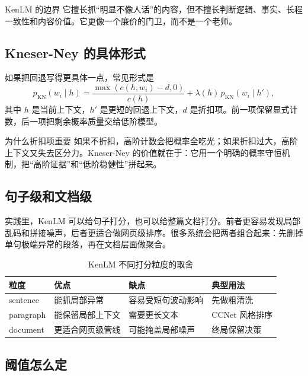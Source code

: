 \documentclass[a4paper]{article}
\begin{document}
\begin{warningbox}{KenLM 的边界}
它擅长抓“明显不像人话”的内容，但不擅长判断逻辑、事实、长程一致性和内容价值。它更像一个廉价的门卫，而不是一个老师。
\end{warningbox}

\subsection{Kneser-Ney 的具体形式}

如果把回退写得更具体一点，常见形式是
\[
p_{\mathrm{KN}}(w_i\mid h)=\frac{\max(c(h,w_i)-d,0)}{c(h)}+\lambda(h)\,p_{\mathrm{KN}}(w_i\mid h'),
\]
其中 $h$ 是当前上下文，$h'$ 是更短的回退上下文，$d$ 是折扣项。前一项保留显式计数，后一项把剩余概率质量交给低阶模型。

\begin{importantbox}{为什么折扣项重要}
如果不折扣，高阶计数会把概率全吃光；如果折扣过大，高阶上下文又失去区分力。Kneser-Ney 的价值就在于：它用一个明确的概率守恒机制，把“高阶证据”和“低阶稳健性”拼起来。
\end{importantbox}

\subsection{句子级和文档级}

实践里，KenLM 可以给句子打分，也可以给整篇文档打分。前者更容易发现局部乱码和拼接噪声，后者更适合做网页级排序。很多系统会把两者组合起来：先删掉单句极端异常的段落，再在文档层面做聚合。

\begin{table}[H]
\centering
\small
\renewcommand{\arraystretch}{1.15}
\begin{tabular}{p{2.4cm}p{4.2cm}p{4.2cm}p{3.0cm}}
\toprule
\textbf{粒度} & \textbf{优点} & \textbf{缺点} & \textbf{典型用法} \\
\midrule
sentence & 能抓局部异常 & 容易受短句波动影响 & 先做粗清洗 \\
paragraph & 能保留局部上下文 & 需要更长文本 & CCNet 风格排序 \\
document & 更适合网页级管线 & 可能掩盖局部噪声 & 终局保留决策 \\
\bottomrule
\end{tabular}
\caption{KenLM 不同打分粒度的取舍}
\end{table}

\subsection{阈值怎么定}
\end{document}
